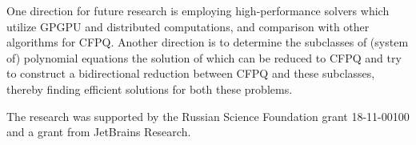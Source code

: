 \documentclass[sigconf]{acmart}
\begin{document}
One direction for future research is employing high-performance solvers which utilize GPGPU and distributed computations, and comparison with other algorithms for CFPQ.
Another direction is to determine the subclasses of (system of) polynomial equations the solution of which can be reduced to CFPQ and try to construct a bidirectional reduction between CFPQ and these subclasses, thereby finding efficient solutions for both these problems.



\begin{acks}
The research was supported by the Russian Science Foundation grant 18-11-00100 and a grant from JetBrains Research.
\end{acks}




\end{document}
